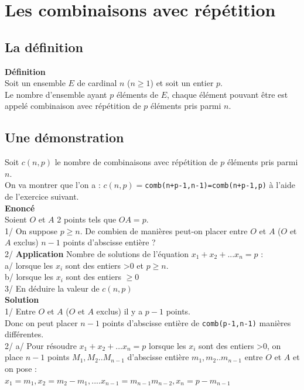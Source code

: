 \documentclass[a4paper,11pt]{book}
\begin{document}
\section{Les combinaisons avec r\'ep\'etition}
\subsection{La d\'efinition} 
{\bf D\'efinition}\\
Soit un ensemble $E$ de cardinal $n$ ($n\geq 1$) et soit un entier $p$.\\
Le nombre d'ensemble ayant $p$ \'el\'ements de $E$, chaque \'el\'ement pouvant 
\^etre est appel\'e combinaison avec r\'ep\'etition de $p$ \'el\'ements pris 
parmi $n$.\\
\subsection{Une d\'emonstration}
Soit $c(n,p)$ le nombre de combinaisons avec r\'ep\'etition de $p$ \'el\'ements 
pris parmi $n$.\\
On va montrer que l'on a : $c(n,p)=${\tt comb(n+p-1,n-1)=comb(n+p-1,p)} \`a 
l'aide de l'exercice suivant.\\
{\bf Enonc\'e}\\
Soient $O$ et $A$ 2 points tels que $OA=p$.\\ 
1/ On suppose $p\geq n$. De combien de mani\`eres peut-on placer entre $O$ et $A$ ($O$ et $A$ exclus) $n-1$ points d'abscisse enti\`ere ?\\
2/ {\bf Application} Nombre de solutions  de l'\'equation $x_1+x_2+...x_n=p$ :\\
a/ lorsque les $x_i$  sont des entiers >0 et $p\geq n$.\\ 
b/ lorsque les $x_i$  sont des entiers $\geq 0$\\
3/ En d\'eduire la valeur de $c(n,p)$\\
{\bf Solution}\\
1/ Entre $O$ et $A$ ($O$ et $A$ exclus) il y a $p-1$ points.\\
Donc on peut placer $n-1$ points d'abscisse enti\`ere de {\tt comb(p-1,n-1)}
mani\`eres diff\'erentes.\\ 
2/ a/ Pour r\'esoudre $x_1+x_2+...x_n=p$ lorsque les $x_i$  sont des entiers >0,
on place $n-1$ points $M_1,M_2..M_{n-1}$ 
d'abscisse enti\`ere $m_1,m_2..m_{n-1}$ entre $O$ et $A$ et on pose :\\
$x_1=m_1,x_2=m_2-m_1,....x_{n-1}=m_{n-1}m_{n-2},x_n=p-m_{n-1}$\\
\end{document}
